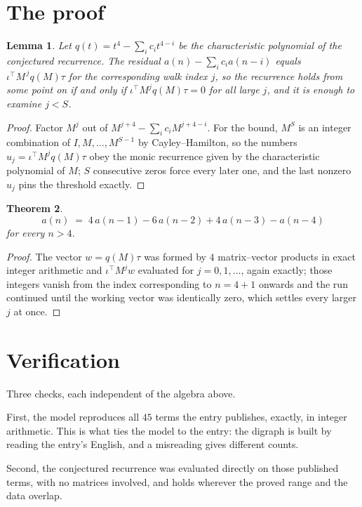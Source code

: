 \documentclass[11pt,a4paper]{article}
\theoremstyle{plain}
\newtheorem{theorem}{Theorem}
\newtheorem{lemma}[theorem]{Lemma}
\theoremstyle{definition}
\begin{document}
\section{The proof}

\begin{lemma}\label{lem:crit}
Let $q(t)=t^{4}-\sum_i c_it^{4-i}$ be the characteristic polynomial of the
conjectured recurrence. The residual $a(n)-\sum_ic_ia(n-i)$ equals
$\iota^{\!\top}M^{\,j}q(M)\tau$ for the corresponding walk index $j$, so the recurrence
holds from some point on if and only if $\iota^{\!\top}M^{j}q(M)\tau=0$ for all large $j$,
and it is enough to examine $j<S$.
\end{lemma}

\begin{proof}
Factor $M^{j}$ out of $M^{j+4}-\sum_ic_iM^{j+4-i}$. For the bound, $M^{S}$
is an integer combination of $I,M,\dots,M^{S-1}$ by Cayley--Hamilton, so the numbers
$u_j=\iota^{\!\top}M^{j}q(M)\tau$ obey the monic recurrence given by the characteristic
polynomial of $M$; $S$ consecutive zeros force every later one, and the last nonzero $u_j$
pins the threshold exactly.
\end{proof}

\begin{theorem}
\[
a(n)\;=\;4\,a(n-1) - 6\,a(n-2) + 4\,a(n-3) - a(n-4)
\]
for every $n>4$.
\end{theorem}

\begin{proof}
The vector $w=q(M)\tau$ was formed by $4$ matrix--vector products in exact integer
arithmetic and $\iota^{\!\top}M^{j}w$ evaluated for $j=0,1,\dots$, again exactly; those
integers vanish from the index corresponding to $n=4+1$ onwards and the run continued
until the working vector was identically zero, which settles every larger $j$ at once.
\end{proof}

\section{Verification}

Three checks, each independent of the algebra above.

First, the model reproduces all $45$ terms the entry publishes, exactly, in integer
arithmetic. This is what ties the model to the entry: the digraph is built by reading the
entry's English, and a misreading gives different counts.

Second, the conjectured recurrence was evaluated directly on those published terms, with no
matrices involved, and holds wherever the proved range and the data overlap.
\end{document}
